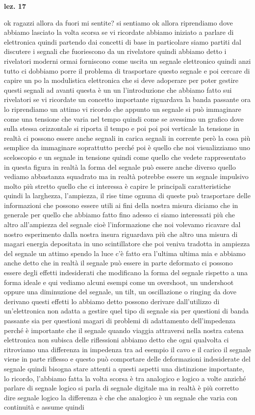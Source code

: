 {\textbf{lez. 17}

ok ragazzi allora da fuori mi sentite? si sentiamo ok allora riprendiamo dove abbiamo lasciato la volta scorsa se vi ricordate abbiamo iniziato a parlare di elettronica quindi partendo dai concetti di base in particolare siamo partiti dal discutere i segnali che fuoriescono da un rivelatore quindi abbiamo detto i rivelatori moderni ormai forniscono come uscita un segnale elettronico quindi anzi tutto ci dobbiamo porre il problema di trasportare questo segnale e poi cercare di capire un po la modulistica elettronica che si deve adoperare per poter gestire questi segnali ad avanti questa è un un l'introduzione che abbiamo fatto sui rivelatori se vi ricordate un concetto importante riguardava la banda passante ora lo riprendiamo un attimo vi ricordo che appunto un segnale si può immaginare come una tensione che varia nel tempo quindi come se avessimo un grafico dove sulla stessa orizzontale si riporta il tempo e poi poi poi verticale la tensione in realtà ci possono essere anche segnali in carica segnali in corrente però la cosa più semplice da immaginare soprattutto perché poi è quello che noi visualizziamo uno sceloscopio e un segnale in tensione quindi come quello che vedete rappresentato in questa figura in realtà la forma del segnale può essere anche diverso quello vediamo abbastanza squadrato ma in realtà potrebbe essere un segnale impulsivo molto più stretto quello che ci interessa è capire le principali caratteristiche quindi la larghezza, l'ampiezza, il rise time ognuna di queste può trasportare delle informazioni che possono essere utili ai fini della nostra misura diciamo che in generale per quello che abbiamo fatto fino adesso ci siamo interessati più che altro all'ampiezza del segnale cioè l'informazione che noi volevamo ricavare dal nostro esperimento dalla nostra insura riguardava più che altro una misura di magari energia depositata in uno scintillatore che poi veniva tradotta in ampiezza del segnale un attimo spendo la luce c'è fatto era l'ultima ultima mia e abbiamo anche detto che in realtà il segnale può essere in parte deformato ci possono essere degli effetti indesiderati che modificano la forma del segnale rispetto a una forma ideale e qui vediamo alcuni esempi come un overshoot, un undershoot oppure una diminuzione del segnale, un tilt, un oscillazione o ringing da dove derivano questi effetti lo abbiamo detto possono derivare dall'utilizzo di un'elettronica non adatta a gestire quel tipo di segnale sia per questioni di banda passante sia per questioni magari di problemi di adattamento dell'impedenza perché è importante che il segnale quando viaggia attraversi nella nostra catena elettronica non subisca delle riflessioni abbiamo detto che ogni qualvolta ci ritroviamo una differenza in impedenza tra ad esempio il cavo e il carico il segnale viene in parte riflesso e questo può comportare delle deformazioni indesiderate del segnale quindi bisogna stare attenti a questi aspetti una distinzione importante, lo ricordo, l'abbiamo fatta la volta scorsa è tra analogico e logico a volte anziché parlare di segnale logico si parla di segnale digitale ma in realtà è più corretto dire segnale logico la differenza è che che analogico è un segnale che varia con continuità e assume quindi }
